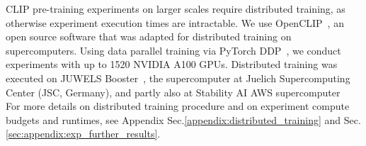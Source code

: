 \documentclass[11pt,table]{article}
\newcommand{\citep}{\cite}
\begin{document}

CLIP pre-training experiments on larger scales require distributed training, as otherwise experiment execution times are intractable. We use OpenCLIP~\citep{ilharco_gabriel_2021_5143773}, an open source software that was adapted for distributed training on supercomputers. Using data parallel training via PyTorch DDP~\cite{li2020pytorch, paszke2019pytorch}, we conduct experiments with up to 1520 NVIDIA A100 GPUs. Distributed training was executed on JUWELS Booster~\citep{JUWELSBooster2020}, the supercomputer at Juelich Supercomputing Center (JSC, Germany), and partly also at Stability AI AWS supercomputer~\citep{stability_hpc} For more details on distributed training procedure and on experiment compute budgets and runtimes, see Appendix Sec.\ref{appendix:distributed_training} and Sec. \ref{sec:appendix:exp_further_results}.





\end{document}
